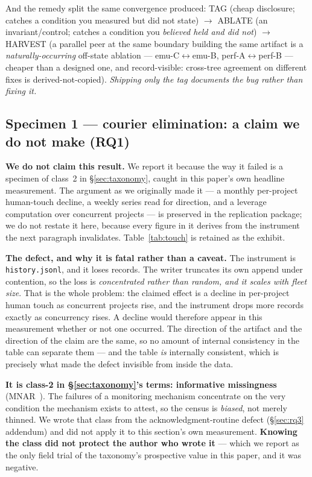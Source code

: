 \documentclass[10pt,conference]{IEEEtran}   %
\begin{document}
And the remedy split the same convergence produced: TAG (cheap disclosure;
catches a condition you measured but did not state) $\rightarrow$ ABLATE (an
invariant/control; catches a condition you \emph{believed held and did not}) $\rightarrow$
HARVEST (a parallel peer at the same boundary building the same artifact is a
\emph{naturally-occurring} off-state ablation --- emu-C$\leftrightarrow$emu-B,
perf-A$\leftrightarrow$perf-B --- cheaper than a designed one, and record-visible: cross-tree
agreement on different fixes is derived-not-copied). \emph{Shipping only the tag documents the
bug rather than fixing it.}

\subsection{Specimen 1 --- courier elimination: a claim we do not make (RQ1)}
\label{sec:rq1}
\textbf{We do not claim this result.} We report it because the way it failed is a specimen of
class~2 in \S\ref{sec:taxonomy}, caught in this paper's own headline measurement. The argument as we
originally made it --- a monthly per-project human-touch decline, a weekly series read for
direction, and a leverage computation over concurrent projects --- is preserved in the replication
package; we do not restate it here, because every figure in it derives from the instrument the next
paragraph invalidates. Table~\ref{tab:touch} is retained as the exhibit.

\textbf{The defect, and why it is fatal rather than a caveat.} The instrument is
\texttt{history.jsonl}, and it loses records. The writer truncates its own append under
contention, so the loss is \emph{concentrated rather than random, and it scales with fleet size}.
That is the whole problem: the claimed effect is a decline in per-project human touch as concurrent
projects rise, and the instrument drops more records exactly as concurrency rises. A decline would
therefore appear in this measurement whether or not one occurred. The direction of the artifact and
the direction of the claim are the same, so no amount of internal consistency in the table can
separate them --- and the table \emph{is} internally consistent, which is precisely what made the
defect invisible from inside the data.

\textbf{It is class-2 in \S\ref{sec:taxonomy}'s terms: informative missingness}
(MNAR~\cite{rubin1976}). The failures of a monitoring mechanism concentrate on the very condition
the mechanism exists to attest, so the census is \emph{biased}, not merely thinned. We wrote that
class from the acknowledgment-routine defect (\S\ref{sec:rq3} addendum) and did not apply it to this
section's own measurement. \textbf{Knowing the class did not protect the author who
wrote it} --- which we report as the only field trial of the taxonomy's prospective value in this
paper, and it was negative.
\end{document}

